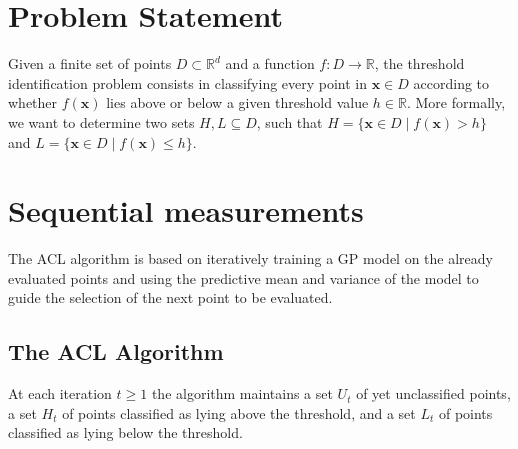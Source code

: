\documentclass{article}
\def\*#1{\bm{#1}}
\newcommand{\acl}{\textsf{ACL}\xspace}
\begin{document}
 


\begin{abstract}\end{abstract} 


\section{Problem Statement}
Given a finite set of points $D \subset \mathbb{R}^d$ and a function
${f : D \to \mathbb{R}}$, the threshold identification problem consists in
classifying every point in $\*x \in D$ according to whether $f(\*x)$ lies
above or below a given threshold
value $h\in \mathbb{R}$. More formally, we want to determine two sets
$H, L \subseteq D$, such that
$H = \{\*x \in D \mid f(\*x) > h\}$ and $L = \{\*x \in D \mid f(\*x) \leq h\}$.

\section{Sequential measurements}
The \acl algorithm is based on iteratively training a GP model on the
already evaluated points and using the predictive mean and variance of the
model to guide the selection of the next point to be evaluated.

\subsection{The \acl Algorithm}
At each iteration $t \geq 1$ the algorithm maintains a set $U_t$ of yet
unclassified points, a set $H_t$ of points classified as lying above
the threshold, and a set $L_t$ of points classified as lying below the
threshold.
\end{document}
